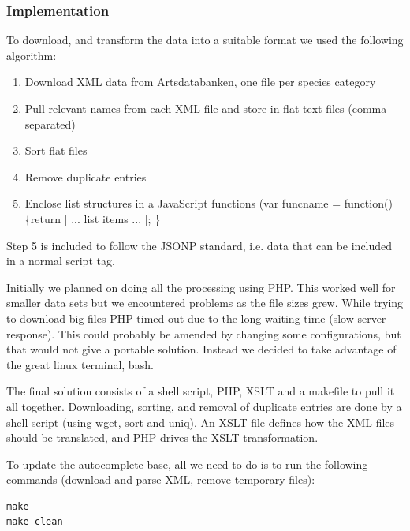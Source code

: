 	\subsubsection{Implementation}
		To download, and transform the data into a suitable format we used the
		following algorithm:

		\begin{enumerate}
			\item Download XML data from Artsdatabanken, one file per species category
			\item Pull relevant names from each XML file and store in flat text files (comma separated)
			\item Sort flat files
			\item Remove duplicate entries
			\item Enclose list structures in a JavaScript functions (var
			funcname = function() \{return [ ... list items ... ]; \}
		\end{enumerate}

		Step 5 is included to follow the JSONP standard, i.e. data
		that can be included in a normal script tag.

		Initially we planned on doing all the processing using PHP. This worked
		well for smaller data sets but we encountered problems as the file
		sizes grew. While trying to download big files PHP timed out due to the
		long waiting time (slow server response). This could probably be
		amended by changing some configurations, but that would not give a
		portable solution. Instead we decided to take advantage of the great
		linux terminal, bash.

		The final solution consists of a shell script, PHP, XSLT and a makefile
		to pull it all together.  Downloading, sorting, and removal of
		duplicate entries are done by a shell script (using wget, sort and
		uniq). An XSLT file defines how the XML files should be translated, and
		PHP drives the XSLT transformation.

		To update the autocomplete base, all we need to do is to run the
		following commands (download and parse XML, remove temporary files):
\begin{lstlisting}
make
make clean
\end{lstlisting}

